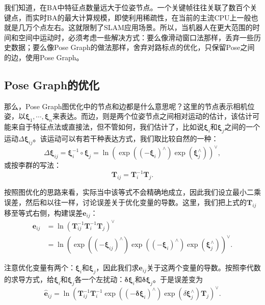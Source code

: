 我们知道，在BA中特征点数量远大于位姿节点。一个关键帧往往关联了数百个关键点，而实时BA的最大计算规模，即使利用稀疏性，在当前的主流CPU上一般也就是几万个点左右。这就限制了SLAM应用场景。所以，当机器人在更大范围的时间和空间中运动时，必须考虑一些解决方式：要么像滑动窗口法那样，丢弃一些历史数据\textsuperscript{\cite{Strasdat2011}}；要么像Pose Graph的做法那样，舍弃对路标点的优化，只保留Pose之间的边，使用Pose Graph\textsuperscript{\cite{Dubbelman2015, Lee2014, Latif2013}}。

\clearpage
\subsection{Pose Graph的优化}
那么，Pose Graph图优化中的节点和边都是什么意思呢？这里的节点表示相机位姿，以$\bm{\xi}_1, \cdots, \bm{\xi}_n$来表达。而边，则是两个位姿节点之间相对运动的估计，该估计可能来自于特征点法或直接法，但不管如何，我们估计了，比如说$\bm{\xi}_i$和$\bm{\xi}_j$之间的一个运动$\Delta \bm{\xi}_{ij}$。该运动可以有若干种表达方式，我们取比较自然的一种：
\begin{equation}
\Delta \bm{\xi}_{ij} = \bm{\xi}_i^{-1} \circ \bm{\xi}_j = \ln \left(\exp \left( (-\bm{\xi}_{i})^\wedge \right) \exp \left( \bm{\xi}_j^\wedge \right) \right)^\vee,
\end{equation}
或按李群的写法：
\begin{equation}
\bm{T}_{ij} =\bm{T}_i^{-1} \bm{T}_j.
\end{equation}

按照图优化的思路来看，实际当中该等式不会精确地成立，因此我们设立最小二乘误差，然后和以往一样，讨论误差关于优化变量的导数。这里，我们把上式的$\bm{T}_{ij}$移至等式右侧，构建误差$\bm{e}_{ij}$：
\begin{equation}
\begin{aligned}
\bm{e}_{ij} &= \ln \left( \bm{T}_{ij}^{-1} \bm{T}_i^{-1} \bm{T}_j \right)^\vee \\ 
&= \ln \left( \exp((-\bm{\xi}_{ij})^\wedge) \exp( (-\bm{\xi}_i)^\wedge) \exp(\bm{\xi}_j^{\wedge} ) \right)^\vee.
\end{aligned}
\end{equation}

注意优化变量有两个：$\bm{\xi}_i$和$\bm{\xi}_j$，因此我们求$\bm{e}_{ij}$关于这两个变量的导数。按照李代数的求导方式，给$\bm{\xi}_i$和$\bm{\xi}_j$各一个左扰动：$ \bm{\delta \xi}_i$和$ \bm{\delta \xi}_j$。于是误差变为
\begin{equation}
\hat{ \bm{e}}_{ij} = \ln \left( \bm{T}_{ij}^{-1}  \bm{T}_i^{-1} \exp((-\bm{\delta \xi}_i)^\wedge) \exp(\delta \bm{\xi}_j^\wedge) \bm{T}_j  \right)^\vee.
\end{equation}

